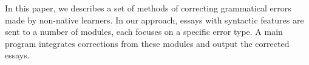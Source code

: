 In this paper, we describes a set of methods of correcting grammatical errors made by non-native learners. In our approach, essays with syntactic features are sent to a number of modules, each focuses on a specific error type. A main program integrates corrections from these modules and output the corrected essays.
